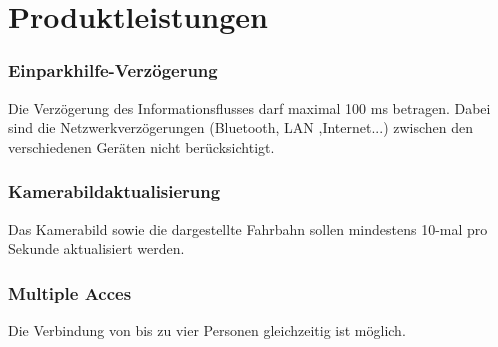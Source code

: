 \documentclass[pflichtenheft.tex]{subfiles}
\begin{document}

\chapter{Produktleistungen}

\subsection{\mkl Einparkhilfe-Verzögerung}
Die Verzögerung des Informationsflusses darf maximal 100 ms betragen. Dabei sind die Netzwerkverzögerungen (Bluetooth, LAN ,Internet...) zwischen den verschiedenen Geräten nicht berücksichtigt. 

\subsection{\mkl Kamerabildaktualisierung}
Das Kamerabild sowie die dargestellte Fahrbahn sollen mindestens 10-mal pro Sekunde aktualisiert werden.

\subsection{\mkl Multiple Acces} Die Verbindung von bis zu vier Personen gleichzeitig ist möglich.
\end{document}
